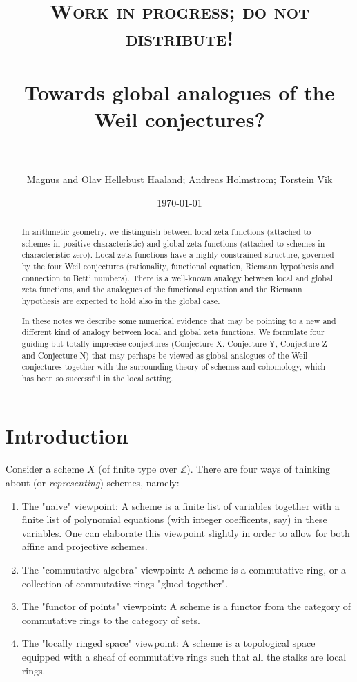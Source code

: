\documentclass[paper=a4, fontsize=11pt]{scrartcl} %
\title{
\normalfont \normalsize
\textsc{Work in progress; do not distribute!} \\ [25pt] %
\horrule{0.5pt} \\[0.4cm] %
\LARGE Towards global analogues of the Weil conjectures? \\ %
\horrule{2pt} \\[0.5cm] %
}
\author{Magnus and Olav Hellebust Haaland; Andreas Holmstrom; Torstein Vik} %
\date{\normalsize\today} %
\numberwithin{equation}{section} %
\numberwithin{figure}{section} %
\numberwithin{table}{section} %
\begin{document}
\maketitle %


\begin{abstract}
In arithmetic geometry, we distinguish between local zeta functions (attached to schemes in positive characteristic) and global zeta functions (attached to schemes in characteristic zero). Local zeta functions have a highly constrained structure, governed by the four Weil conjectures (rationality, functional equation, Riemann hypothesis and connection to Betti numbers). There is a well-known analogy between local and global zeta functions, and the analogues of the functional equation and the Riemann hypothesis are expected to hold also in the global case.

In these notes we describe some numerical evidence that may be pointing to a new and different kind of analogy between local and global zeta functions. We formulate four guiding but totally imprecise conjectures (Conjecture X, Conjecture Y, Conjecture Z and Conjecture N) that may perhaps be viewed as global analogues of the Weil conjectures together with the surrounding theory of schemes and cohomology, which has been so successful in the local setting.
\end{abstract}

\section{Introduction}

Consider a scheme $X$ (of finite type over $\mathbb{Z}$). There are four ways of thinking about (or \emph{representing}) schemes, namely:
\begin{enumerate}
\item The "naive" viewpoint: A scheme is a finite list of variables together with a finite list of polynomial equations (with integer coefficents, say) in these variables. One can elaborate this viewpoint slightly in order to allow for both affine and projective schemes.
\item The "commutative algebra" viewpoint: A scheme is a commutative ring, or a collection of commutative rings "glued together".
\item The "functor of points" viewpoint: A scheme is a functor from the category of commutative rings to the category of sets.
\item The "locally ringed space" viewpoint: A scheme is a topological space equipped with a sheaf of commutative rings such that all the stalks are local rings.
\end{enumerate}
\end{document}
